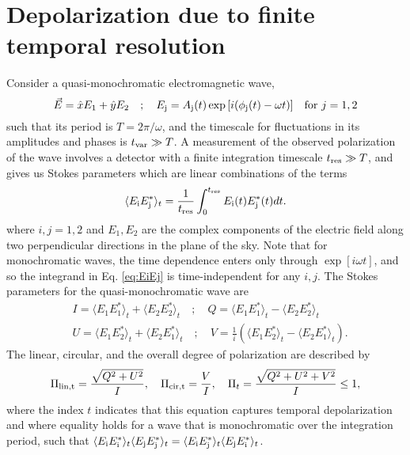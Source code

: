 \documentclass[fleqn,usenatbib]{mnras}
\begin{document}
	\section{Depolarization due to finite temporal resolution}
	\label{sec:tempvar}
	Consider a quasi-monochromatic electromagnetic wave,
	\begin{equation}
		\vec{E}=\hat{x}E_1+\hat{y}E_2 \quad ; \quad E_{\rm j}=A_{\rm j}(t)\exp{[i(\phi_{\rm j}(t) -\omega t)]} \quad \mbox{for } j=1,2
	\end{equation}
	such that its period is $T = 2\pi/\omega$, and the timescale for fluctuations in its amplitudes and phases is $t_{\rm var}\gg T$. A measurement of the observed polarization of the wave involves a detector with a finite integration timescale $t_{\rm res}\gg T$, and gives us Stokes parameters which are linear combinations of the terms
	\begin{equation}
		\label{eq:EiEj}
		\langle E_{\rm i}E_{\rm j}^*\rangle_t=\frac{1}{t_{\rm res}}\int_0^{t_{\rm res}} E_{\rm i}(t)E_{\rm j}^*(t)dt.
	\end{equation}
	where $i,j=1,2$ and $E_1,E_2$ are the complex components of the electric field along two perpendicular directions in the plane of the sky. Note that for monochromatic waves, the time dependence enters only through $\exp{[i\omega t]}$, and so the integrand in Eq. \ref{eq:EiEj} is time-independent for any $i,j$. The Stokes parameters for the quasi-monochromatic wave are
	\begin{eqnarray}
		\label{eq:Stokes}
		& I=\langle E_1E_1^*\rangle_t + \langle E_2E_2^*\rangle_t \quad ; \quad Q=\langle E_1E_1^*\rangle_t - \langle E_2E_2^*\rangle_t \nonumber \\
		& U=\langle E_1E_2^*\rangle_t + \langle E_2E_1^*\rangle_t \quad ; \quad V=\frac{1}{i}(\langle E_1E_2^*\rangle_t - \langle E_2E_1^*\rangle_t).
	\end{eqnarray}
	The linear, circular, and the overall degree of polarization are described by
	\begin{equation}
		\Pi_{\rm lin,t}=\frac{\sqrt{Q^2+U^2}}{I}, \quad \Pi_{\rm cir,t} = \frac{V}{I}, \quad \Pi_t=\frac{\sqrt{Q^2+U^2+V^2}}{I}\leq 1,
	\end{equation}
	where the index $t$ indicates that this equation captures temporal depolarization and where equality holds for a wave that is monochromatic over the integration period, such that $\langle E_{\rm i}E_{\rm i}^*\rangle_t \langle E_{\rm j}E_{\rm j}^*\rangle_t=\langle E_{\rm i}E_{\rm j}^*\rangle_t \langle E_{\rm j}E_{\rm i}^*\rangle_t$.
\end{document}
